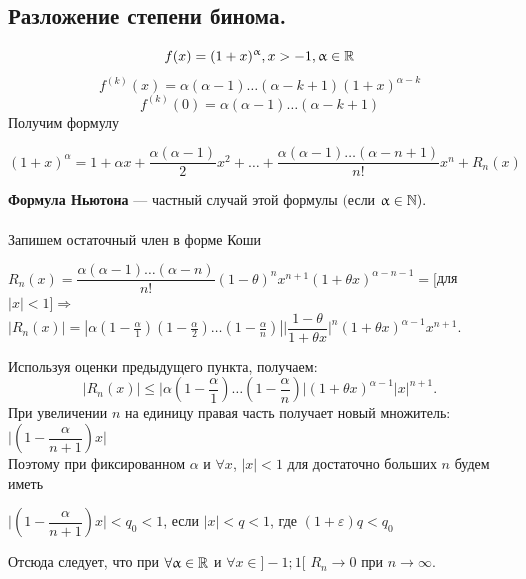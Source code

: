 	\subsection{Разложение степени бинома.}
	$$f(x) = (1+x)^{\upalpha}, x>-1, \upalpha \in \mathbb{R}$$
	$$f^{(k)}(x) = \alpha(\alpha-1) \ldots (\alpha-k+1)(1+x)^{\alpha-k}$$
	$$f^{(k)}(0) = \alpha(\alpha-1) \ldots (\alpha-k+1)$$
	Получим формулу
	\begin{center}
		$(1+x)^{\alpha}=1+\alpha x+\dfrac{\alpha(\alpha-1)}{2}x^2+\ldots+\dfrac{\alpha(\alpha-1)\ldots(\alpha-n+1)}{n!}x^n+R_n(x)$
	\end{center}
	\textbf{Формула Ньютона} --- частный случай этой формулы $($если $\upalpha \in \mathbb{N}).$\\\\
	Запишем остаточный член в форме Коши
	\begin{center}
		$R_n(x)=\dfrac{\alpha(\alpha-1)\ldots(\alpha-n)}{n!}(1-\theta)^n x^{n+1} (1+\theta x)^{\alpha - n -1} = [$для $|x| < 1] \Rightarrow$\\
		$|R_n(x)| = |\alpha(1-\frac{\alpha}{1})(1-\frac{\alpha}{2})\ldots(1-\frac{\alpha}{n})|\Big|\dfrac{1-\theta}{1+\theta x}\Big|^n (1+\theta x)^{\alpha-1} x^{n+1}$. 
	\end{center}
	Используя оценки предыдущего пункта, получаем:
	$$|R_n(x)| \leq \Big|\alpha(1-\frac{\alpha}{1})\ldots(1-\frac{\alpha}{n})\Big|(1+\theta x)^{\alpha-1}|x|^{n+1}.$$
	При увеличении $n$ на единицу правая часть получает новый множитель: $\Big|(1 - \dfrac{\alpha}{n+1})x\Big|$\\
	Поэтому при фиксированном $\alpha$ и $\forall x$, $|x|<1$ для достаточно больших $n$ будем иметь
	\begin{center}
		$\Big|(1-\dfrac{\alpha}{n+1})x\Big| < q_0 < 1$, если $|x|<q<1$, где $(1+\varepsilon)q<q_0$
	\end{center}
	Отсюда следует, что при $\forall\upalpha\in\mathbb{R}$ и $\forall x \in ]-1;1[$ $R_n \to 0$ при $n\to\infty$.
